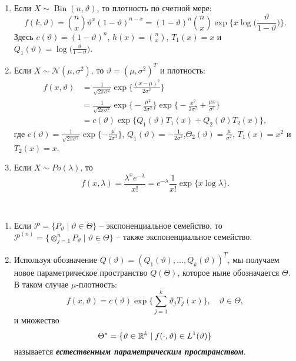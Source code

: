 \begin{exmp}\label{exmp2.34} \
	\begin{enumerate}
		\item Если $X \sim \operatorname{Bin}(n, \vartheta)$, то плотность по счетной мере:
		\[ f(k, \vartheta)=\binom{n}{x} \vartheta^x(1-\vartheta)^{n-x}=(1-\vartheta)^n \binom{n}{x} \exp\Big\{x \log\Big(\frac{\vartheta}{1-\vartheta}\Big) \Big\}.  \]
		Здесь $c(\vartheta) = (1 - \vartheta)^n$, $h(x)=\binom{n}{x}$, $T_1(x) = x$ и $Q_1(\vartheta) = \log\Big(\frac{\vartheta}{1-\vartheta}\Big)$.
		\item Если $X \sim \mathcal{N}(\mu, \sigma^2)$, то $\vartheta=(\mu, \sigma^2)^T$ и плотность:
		\[ 
		\begin{aligned}
		f(x,\vartheta)&=\frac{1}{\sqrt{2 \pi \sigma^2}} \exp\Big\{ \frac{(x-\mu)^2}{2\sigma^2} \Big\} \\
		& = \frac{1}{\sqrt{2 \pi \sigma^2}} \exp \Big \{ -\frac{\mu^2}{2\sigma^2} \Big\}  \exp\Big \{ -\frac{x^2}{2\sigma^2} +\frac{\mu x}{\sigma^2} \Big\} \\
		& = c(\vartheta) \exp \Big\{ Q_1(\vartheta) T_1(x) + Q_2(\vartheta) T_2(x)  \Big \},
		\end{aligned}  \]
		где $c(\vartheta) = \frac{1}{\sqrt{2\pi \sigma^2 }} \exp\{ -\frac{\mu}{2\sigma^2} \} $, $ Q_1(\vartheta) = -\frac{1}{2\sigma^2} $,$\Theta_2(\vartheta) = \frac{\mu}{\sigma^2}$, $T_1(x) = x^2$ и $T_2(x) = x$.
		\item Если $X \sim Po(\lambda)$, то
		\[ f(x, \lambda) = \frac{\lambda^x e^{-\lambda}}{x!}=e^{-\lambda} \frac{1}{x!} \exp\{x \log \lambda \}. \]
    \end{enumerate}
\end{exmp}

\begin{rmrk}\
	\begin{enumerate}
		\item Если $\mathcal{P} = \{P_\vartheta \mid \vartheta \in \Theta \}$ -- экспоненциальное семейство, то $\mathcal{P}^{(n)}=\{ \otimes_{j=1}^n P_\vartheta \mid \vartheta \in \Theta \}$ -- также экспоненциальное семейство.
		\item Используя обозначение $Q(\vartheta) = (Q_1(\vartheta), \dots, Q_k(\vartheta))^T$, мы получаем новое параметрическое пространство $Q(\Theta)$, которое ныне обозначается $\Theta$. В таком случае $\mu$-плотность:
		\[f(x,\vartheta)=c(\vartheta) \exp \Big\{ \sum_{j=1}^k \vartheta_j T_j(x) \Big\}, \quad \vartheta \in \Theta, \]
		и множество
		\[ \Theta^* = \{ \vartheta \in \mathbb{R}^k \mid f(\cdot, \vartheta) \in L^1(\vartheta) \} \]
		называется \textbf{\textit{естественным параметрическим пространством}}.
	\end{enumerate}
\end{rmrk}

